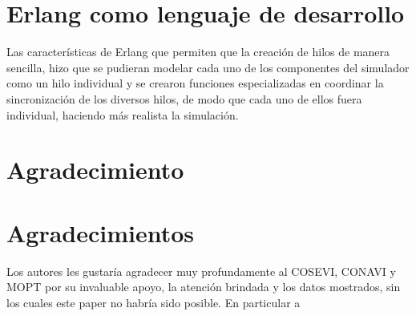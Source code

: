 \documentclass[12pt,journal,compsoc]{IEEEtran}
\begin{document}

%


\appendices
\section{Erlang como lenguaje de desarrollo}
Las características de Erlang que permiten que la creaci\'on de hilos de manera sencilla, hizo que se pudieran modelar cada uno de los componentes del simulador como un hilo individual y se crearon funciones especializadas en coordinar la sincronizaci\'on de los diversos hilos, de modo que cada uno de ellos fuera individual, haciendo m\'as realista la simulación.

\ifCLASSOPTIONcompsoc
  \section*{Agradecimiento}
\else
  \section*{Agradecimientos}
\fi


Los autores les gustaría agradecer muy profundamente al COSEVI, CONAVI y MOPT por su invaluable apoyo, la atenci\'on brindada y los datos mostrados, sin los cuales este paper no habr\'ia sido posible. En particular a %
\end{document}

